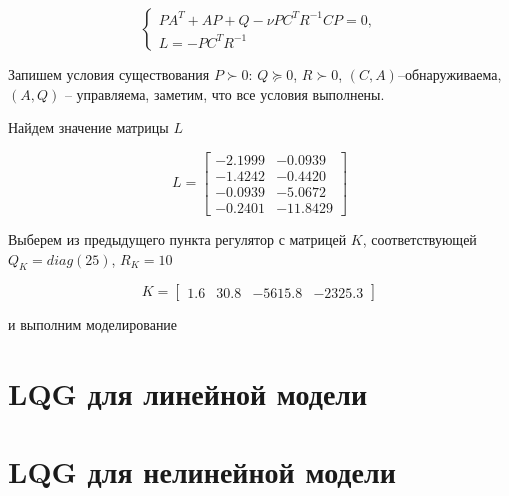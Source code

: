 \begin{equation}
	\begin{cases}
		PA^T+AP+Q-\nu PC^TR^{-1}CP=0,\\
		L = -PC^TR^{-1}
	\end{cases}
\end{equation}

Запишем условия существования $P \succ 0$: $Q \succeq 0$, $R \succ 0$, $(C,A)$--обнаруживаема, $(A,Q)$ -- управляема, заметим, что все условия выполнены.

Найдем значение матрицы $L$

\begin{equation}
	L = \begin{bmatrix}
		   -2.1999 &  -0.0939\\
		-1.4242 &  -0.4420\\
		-0.0939 &  -5.0672\\
		-0.2401 & -11.8429
	\end{bmatrix}
\end{equation}

Выберем из предыдущего пункта регулятор с матрицей $K$, соответствующей $Q_K=diag(25)$, $R_K=10$

 \begin{equation}
	K = \begin{bmatrix}
		1.6  &  30.8 &  -5615.8 &  -2325.3
	\end{bmatrix}
\end{equation}

и выполним моделирование



\section{LQG для линейной модели}


\section{LQG для нелинейной модели}


\endinput